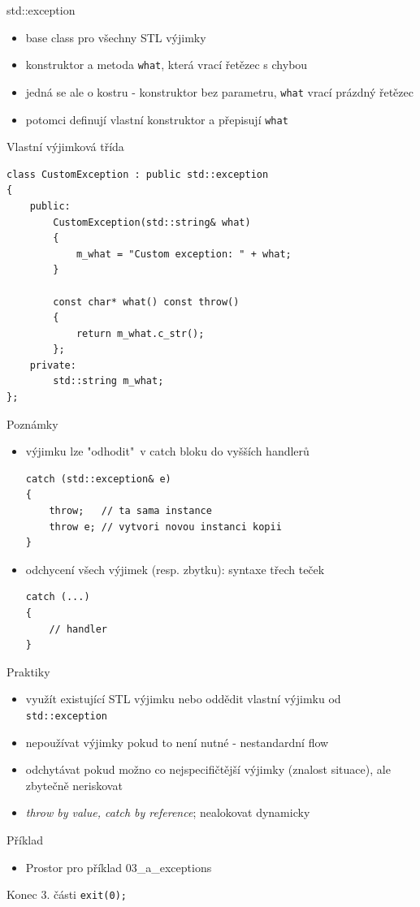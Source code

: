 \documentclass{beamer}
\begin{document}
\begin{xframe}{std::exception}
	\begin{itemize}
		\item base class pro všechny STL výjimky
		\item konstruktor a metoda \texttt{what}, která vrací řetězec s chybou
		\item jedná se ale o kostru - konstruktor bez parametru, \texttt{what} vrací prázdný řetězec
		\item potomci definují vlastní konstruktor a přepisují \texttt{what}
	\end{itemize}
\end{xframe}

\begin{xframe}{Vlastní výjimková třída}
\begin{lstlisting}[basicstyle=\fontsize{8}{9}\selectfont\ttfamily]
class CustomException : public std::exception
{
    public:
        CustomException(std::string& what)
        {
            m_what = "Custom exception: " + what;
        }

        const char* what() const throw()
        {
            return m_what.c_str();
        };
    private:
        std::string m_what;
};
\end{lstlisting}
\end{xframe}

\begin{xframe}{Poznámky}
	\begin{itemize}
		\item výjimku lze "odhodit"~v catch bloku do vyšších handlerů
\begin{lstlisting}[basicstyle=\fontsize{8}{9}\selectfont\ttfamily]
catch (std::exception& e)
{
    throw;   // ta sama instance
    throw e; // vytvori novou instanci kopii
}
\end{lstlisting}
		\item odchycení všech výjimek (resp. zbytku): syntaxe třech teček
\begin{lstlisting}[basicstyle=\fontsize{8}{9}\selectfont\ttfamily]
catch (...)
{
    // handler
}
\end{lstlisting}
	\end{itemize}
\end{xframe}

\begin{xframe}{Praktiky}
	\begin{itemize}
		\item využít existující STL výjimku nebo oddědit vlastní výjimku od \texttt{std::exception}
		\item nepoužívat výjimky pokud to není nutné - nestandardní flow
		\item odchytávat pokud možno co nejspecifičtější výjimky (znalost situace), ale zbytečně neriskovat
		\item \emph{throw by value, catch by reference}; nealokovat dynamicky
	\end{itemize}
\end{xframe}


\begin{xframe}{Příklad}
	\begin{itemize}
		\item Prostor pro příklad 03\_a\_exceptions
	\end{itemize}
\end{xframe}




\begin{xframe}{Konec 3. části}
\texttt{exit(0);}
\end{xframe}
\end{document}
